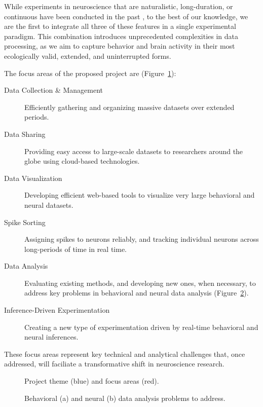 While experiments in neuroscience that are naturalistic, long-duration, or
continuous have been conducted in the past
\citep[e.g.,][]{jhuangEtAl10,maoEtAl21,volohEtAl23}, to the best of our
knowledge, we are the first to integrate all three of these features in a
single experimental paradigm.
%
This combination introduces unprecedented complexities in data processing, as
we aim to capture behavior and brain activity in their most ecologically valid,
extended, and uninterrupted forms.

The focus areas of the proposed project are (Figure~\ref{fig:focusAreas}):

\begin{description}

    \item[Data Collection \& Management] Efficiently gathering and organizing
        massive datasets over extended periods.

    \item[Data Sharing] Providing easy access to large-scale datasets
        to researchers around the globe using cloud-based technologies.

    \item[Data Visualization] Developing efficient web-based tools to visualize
        very large behavioral and neural datasets.

    \item[Spike Sorting] Assigning spikes to neurons reliably, and tracking
        individual neurons across long-periods of time in real time.

    \item[Data Analysis] Evaluating existing methods, and developing new ones,
        when necessary, to address key problems in behavioral and neural data
        analysis (Figure~\ref{fig:dataAnalysis}).

    \item[Inference-Driven Experimentation] Creating a new type of
        experimentation driven by real-time behavioral and neural inferences.

\end{description}

These focus areas represent key technical and analytical challenges that, once
addressed, will faciliate a transformative shift in neuroscience research.

\begin{figure}
    \begin{center}
        \resizebox{4.0in}{!}{%
            
        }
    \end{center}
    \caption{Project theme (blue) and focus areas (red).}
    \label{fig:focusAreas}
\end{figure}

\begin{figure}
    \centering
    \subfloat[]{
        \resizebox{3.0in}{!}{%
            
        }
    }
    \hfill
    \subfloat[]{
        \resizebox{3.0in}{!}{%
            
        }
    }
    \caption{Behavioral (a) and neural (b) data analysis problems to address.}
    \label{fig:dataAnalysis}
\end{figure}

